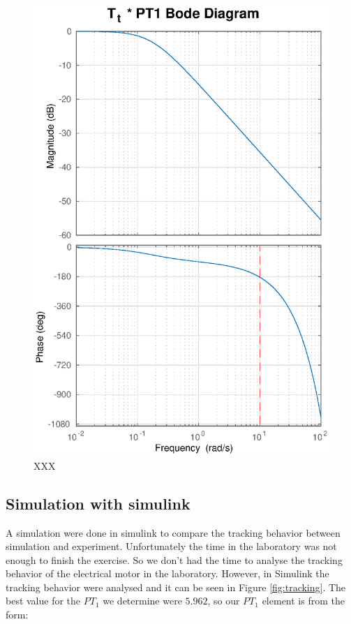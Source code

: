 \begin{figure}
    \centering
    \includegraphics[width=\linewidth]{images/Tt_PT1_bode}
    \caption{XXX}
\end{figure}


\subsection{Simulation with simulink}

A simulation were done in  simulink  to  compare the tracking behavior between
simulation and  experiment. Unfortunately  the  time in the  laboratory  was  not  enough  to  finish  the exercise. So we don't had the time to analyse  the  tracking  behavior  of the electrical motor in the laboratory. However, in Simulink the tracking behavior
were analysed and it can be seen in  Figure \ref{fig:tracking}. The best value for the $PT_{1}$ we determine were
$5.962$, so our $PT_{1}$ element is from the form:

